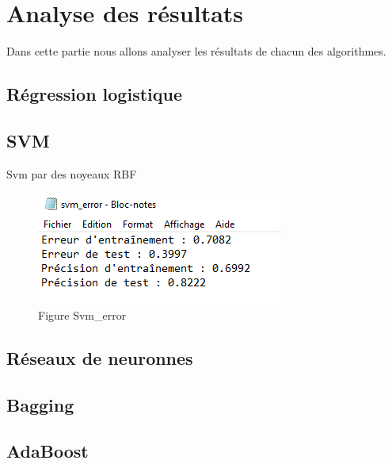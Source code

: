 \chapter{Analyse des résultats}
\par Dans cette partie nous allons analyser les résultats de chacun des algorithmes.
\section{Régression logistique}
\section{SVM}
\par Svm par des noyeaux RBF
\begin{figure}[H]
    \centering
    \includegraphics{svm.png}
    \caption{Figure Svm\_error }
    \label{Figure fichier Svm\_error }
\end{figure}
\section{Réseaux de neuronnes}
\section{Bagging}
\section{AdaBoost} 

